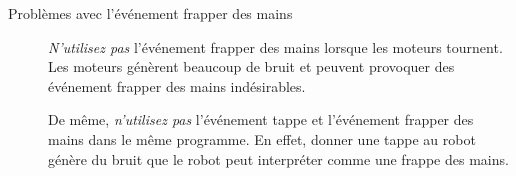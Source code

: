 \begin{description}
\item[Problèmes avec l'événement frapper des mains]
\emph{N'utilisez pas} l'événement frapper des mains  lorsque les moteurs tournent.
Les moteurs génèrent beaucoup de bruit et peuvent provoquer des événement frapper des mains
indésirables.

De même, \emph{n'utilisez pas} l'événement tappe  et l'événement frapper des mains dans le même programme.
En effet, donner une tappe au robot génère du bruit que le robot peut interpréter comme une frappe
des mains.

\end{description}
